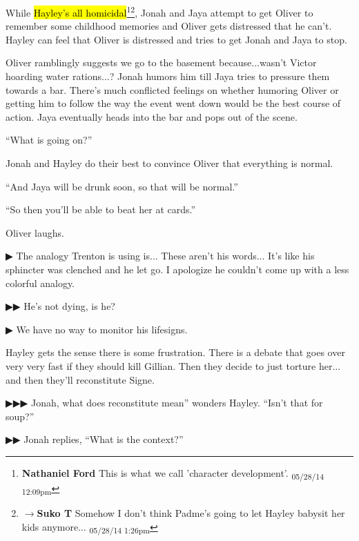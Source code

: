 While \hl{Hayley's all homicidal}\footnote{\textbf{Nathaniel Ford }This is what we call 'character development'. \textsubscript{05/28/14 12:09pm}}\footnote{$\rightarrow$\textbf{Suko T }Somehow I don't think Padme's going to let Hayley babysit her kids anymore... \textsubscript{05/28/14 1:26pm}}, Jonah and Jaya attempt to get Oliver to remember some childhood memories and Oliver gets distressed that he can't.  Hayley can feel that Oliver is distressed and tries to get Jonah and Jaya to stop.



Oliver ramblingly suggests we go to the basement because...wasn't Victor hoarding water rations...?  Jonah humors him till Jaya tries to pressure them towards a bar. There's much conflicted feelings on whether humoring Oliver or getting him to follow the way the event went down would be the best course of action.  Jaya eventually heads into the bar and pops out of the scene. 



``What is going on?''

Jonah and Hayley do their best to convince Oliver that everything is normal.

``And Jaya will be drunk soon, so that will be normal.''

``So then you'll be able to beat her at cards.''

Oliver laughs.



 {\color[RGB]{68,68,68}▶}  The analogy Trenton is using is... These aren't his words... It's like his sphincter was clenched and he let go.  I apologize he couldn't come up with a less colorful analogy.  

 {\color[RGB]{68,68,68}▶▶ } He's not dying, is he?

 {\color[RGB]{68,68,68}▶ } We have no way to monitor his lifesigns. 



 Hayley gets the sense there is some frustration.  There is a debate that goes over very very fast if they should kill Gillian.  Then they decide to just torture her... and then they'll reconstitute Signe. 



 {\color[RGB]{68,68,68}▶▶▶  } Jonah, what does reconstitute mean'' wonders Hayley.  ``Isn't that for soup?''

 {\color[RGB]{68,68,68}▶▶ } Jonah replies, ``What is the context?''

